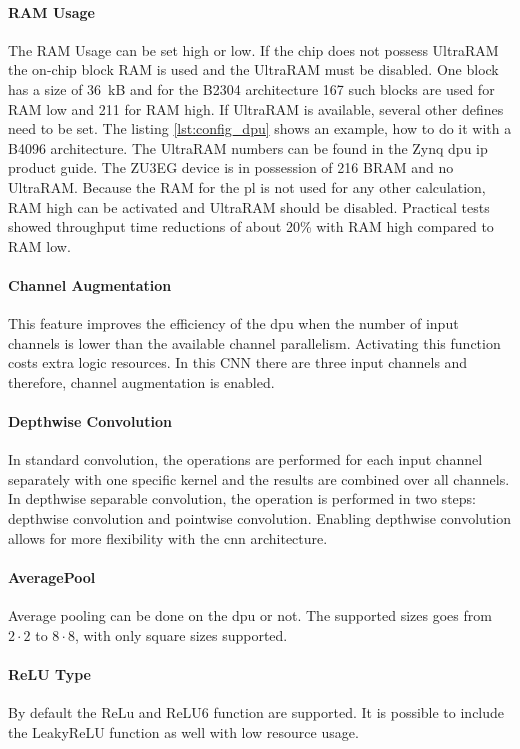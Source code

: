 \paragraph{RAM Usage}
The RAM Usage can be set high or low.
If the chip does not possess UltraRAM the on-chip block RAM is used and the UltraRAM must be disabled.
One block has a size of \SI{36}{kB} and for the B2304 architecture 167 such blocks are used for RAM low and 211 for RAM high.
If UltraRAM is available, several other defines need to be set.
The listing \ref{lst:config_dpu} shows an example, how to do it with a B4096 architecture.
The UltraRAM numbers can be found in the Zynq \acrshort{dpu} \acrshort{ip} product guide.
The ZU3EG device is in possession of 216 BRAM and no UltraRAM.
Because the RAM for the \acrshort{pl} is not used for any other calculation, RAM high can be activated and UltraRAM should be disabled.
Practical tests showed throughput time reductions of about 20\% with RAM high compared to RAM low.

\paragraph{Channel Augmentation}
This feature improves the efficiency of the \acrshort{dpu} when the number of input channels is lower than the available channel parallelism.
Activating this function costs extra logic resources.
In this CNN there are three input channels and therefore, channel augmentation is enabled.

\paragraph{Depthwise Convolution}
In standard convolution, the operations are performed for each input channel separately with one specific kernel and the results are combined over all channels.
In depthwise separable convolution, the operation is performed in two steps: depthwise convolution and pointwise convolution.
Enabling  depthwise convolution allows for more flexibility with the \acrshort{cnn} architecture.

\paragraph{AveragePool}
Average pooling can be done on the \acrshort{dpu} or not.
The supported sizes goes from $2\cdot2$ to $8\cdot8$, with only square sizes supported.

\paragraph{ReLU Type}
By default the ReLu and ReLU6 function are supported.
It is possible to include the LeakyReLU function as well with low resource usage.

